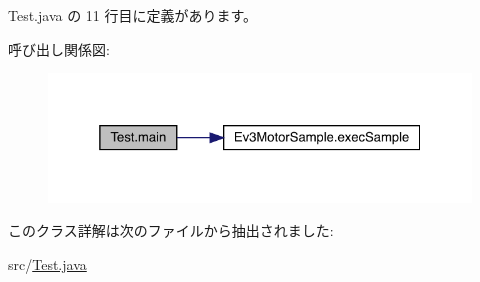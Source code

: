  Test.\+java の 11 行目に定義があります。

呼び出し関係図\+:\nopagebreak
\begin{figure}[H]
\begin{center}
\leavevmode
\includegraphics[width=325pt]{d1/d9b/class_test_ad91b01698e99c4a022d21159dd694250_cgraph}
\end{center}
\end{figure}


このクラス詳解は次のファイルから抽出されました\+:\begin{DoxyCompactItemize}
\item 
src/\mbox{\hyperlink{_test_8java}{Test.\+java}}\end{DoxyCompactItemize}
